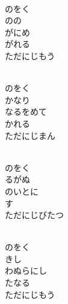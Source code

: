 \documentclass[10pt,b5j]{tarticle} %
\begin{document}
\vspace{1.5em} %
\newcommand{\linespace}{0.5em} %
\newcommand{\blocksize}{0.5\hsize} %
\newcommand{\itemmargin}{6em} %
\begin{enumerate} %
    \setlength{\itemindent}{\itemmargin} %
    \begin{minipage}[c]{\blocksize}
    
        \vspace{\linespace}
        \item~\\
        のをく\\
        のの\\
        がにめ\\
        がれる\\
        ただにじもう
        
        \vspace{\linespace}
        \item~\\
        のをく\\
        かなり\\
        なるをめて\\
        かれる\\
        ただにじまん
        
        \vspace{\linespace}
        \item~\\
        のをく\\
        るがぬ\\
        のいとに\\
        す\\
        ただにじびたつ
        
        \vspace{\linespace}
        \item~\\
        のをく\\
        きし\\
        わぬらにし\\
        たなる\\
        ただにじもう
    
    \end{minipage}
\end{enumerate} %
\end{document}
